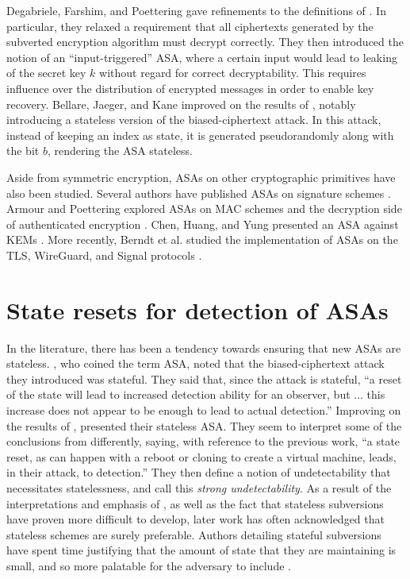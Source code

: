 Degabriele, Farshim, and Poettering \cite{FSE:DegFarPoe15} gave refinements to the definitions of \cite{C:BelPatRog14}. In particular, they relaxed a requirement that all ciphertexts generated by the subverted encryption algorithm must decrypt correctly. They then introduced the notion of an ``input-triggered'' ASA, where a certain input would lead to leaking of the secret key $k$ without regard for correct decryptability. This requires influence over the distribution of encrypted messages in order to enable key recovery. Bellare, Jaeger, and Kane \cite{CCS:BelJaeKan15} improved on the results of \cite{C:BelPatRog14}, notably introducing a stateless version of the biased-ciphertext attack. In this attack, instead of keeping an index as state, it is generated pseudorandomly along with the bit $b$, rendering the ASA stateless.

Aside from symmetric encryption, ASAs on other cryptographic primitives have also been studied. Several authors have published ASAs on signature schemes \cite{CCS:AteMagVen15,BSKC2019,ACISP:LCWW18}. Armour and Poettering explored ASAs on MAC schemes and the decryption side of authenticated encryption \cite{ToSC:ArmPoe19,IMA:ArmPoe19}. Chen, Huang, and Yung presented an ASA against KEMs \cite{AC:CheHuaYun20}. More recently, Berndt et al. studied the implementation of ASAs on the TLS, WireGuard, and Signal protocols \cite{EPRINT:BWPTE20}.

\section{State resets for detection of ASAs}
In the literature, there has been a tendency towards ensuring that new ASAs are stateless. \cite{C:BelPatRog14}, who coined the term ASA, noted that the biased-ciphertext attack they introduced was stateful. They said that, since the attack is stateful, ``a reset of the state will lead to increased detection ability for an observer, but ... this increase does not appear to be enough to lead to actual detection.'' Improving on the results of \cite{C:BelPatRog14}, \cite{CCS:BelJaeKan15} presented their stateless ASA. They seem to interpret some of the conclusions from \cite{C:BelPatRog14} differently, saying, with reference to the previous work, ``a state reset, as can happen with a reboot or cloning to create a virtual machine, leads, in their attack, to detection.'' They then define a notion of undetectability that necessitates statelessness, and call this \emph{strong undetectability}. As a result of the interpretations and emphasis of \cite{CCS:BelJaeKan15}, as well as the fact that stateless subversions have proven more difficult to develop, later work has often acknowledged that stateless schemes are surely preferable. Authors detailing stateful subversions have spent time justifying that the amount of state that they are maintaining is small, and so more palatable for the adversary to include \cite{BSKC2019,AC:CheHuaYun20}.

